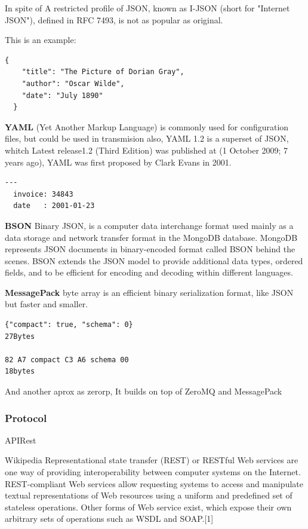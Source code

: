 In spite of A restricted profile of JSON, known as I-JSON (short for "Internet JSON"),
defined in RFC 7493, is not as popular as original.

This is an example:
\begin{lstlisting}[frame=none,numbers=none]
  {
    "title": "The Picture of Dorian Gray",
    "author": "Oscar Wilde",
    "date": "July 1890"
  }
\end{lstlisting}


\textbf{YAML} (Yet Another Markup Language)
 is commonly used for configuration files, but could be used in transmision also,
 YAML 1.2 is a superset of JSON, whitch Latest release1.2 (Third Edition) was published
 at (1 October 2009; 7 years ago), YAML was first proposed by Clark Evans in 2001.

\begin{lstlisting}[frame=none,numbers=none]
  ---
  invoice: 34843
  date   : 2001-01-23
\end{lstlisting}


\textbf{BSON}
Binary JSON, is a computer data interchange format used mainly as a data storage
and network transfer format in the MongoDB database.
MongoDB represents JSON documents in binary-encoded format called BSON behind
the scenes. BSON extends the JSON model to provide additional data types,
ordered fields, and to be efficient for encoding and decoding within different languages.

\textbf{MessagePack}
byte array
is an efficient binary serialization format, like JSON but faster and smaller.

\begin{lstlisting}[frame=none,numbers=none]
{"compact": true, "schema": 0}
27Bytes

82 A7 compact C3 A6 schema 00
18bytes
\end{lstlisting}

And another aprox as zerorp, It builds on top of ZeroMQ and MessagePack

\subsubsection{Protocol}

APIRest

Wikipedia
Representational state transfer (REST) or RESTful Web services are one way of providing interoperability between computer systems on the Internet. REST-compliant Web services allow requesting systems to access and manipulate textual representations of Web resources using a uniform and predefined set of stateless operations. Other forms of Web service exist, which expose their own arbitrary sets of operations such as WSDL and SOAP.[1]

